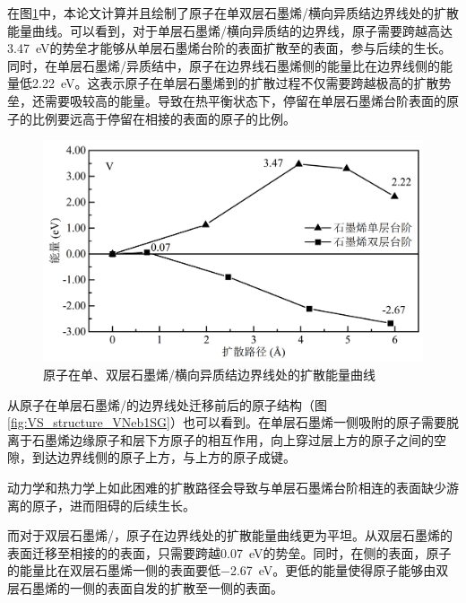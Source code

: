     在图\ref{fig:VS_DFT_NEB_V_GtVSe}中，本论文计算并且绘制了原子在单双层石墨烯/横向异质结边界线处的扩散能量曲线。可以看到，对于单层石墨烯/横向异质结的边界线，原子需要跨越高达\SI{3.47}{\electronvolt}的势垒才能够从单层石墨烯台阶的表面扩散至的表面，参与后续的生长。同时，在单层石墨烯/异质结中，原子在边界线石墨烯侧的能量比在边界线侧的能量低\SI{2.22}{\electronvolt}。这表示原子在单层石墨烯到的扩散过程不仅需要跨越极高的扩散势垒，还需要吸较高的能量。导致在热平衡状态下，停留在单层石墨烯台阶表面的原子的比例要远高于停留在相接的表面的原子的比例。

    \begin{figure}[htb]
        \includegraphics{pic/VS_DFT_NEB_V_GtVSe.png}
        \captionsetup{width=\textwidth}
        \caption{原子在单、双层石墨烯/横向异质结边界线处的扩散能量曲线}
        \label{fig:VS_DFT_NEB_V_GtVSe}
    \end{figure}
    

    从原子在单层石墨烯/的边界线处迁移前后的原子结构（图\ref{fig:VS_structure_VNeb1SG}）也可以看到。在单层石墨烯一侧吸附的原子需要脱离于石墨烯边缘原子和层下方原子的相互作用，向上穿过层上方的原子之间的空隙，到达边界线侧的原子上方，与上方的原子成键。

    动力学和热力学上如此困难的扩散路径会导致与单层石墨烯台阶相连的表面缺少游离的原子，进而阻碍的后续生长。

    而对于双层石墨烯/，原子在边界线处的扩散能量曲线更为平坦。从双层石墨烯的表面迁移至相接的的表面，只需要跨越\SI{0.07}{\electronvolt}的势垒。同时，在侧的表面，原子的能量比在双层石墨烯一侧的表面要低\SI{-2.67}{\electronvolt}。更低的能量使得原子能够由双层石墨烯的一侧的表面自发的扩散至一侧的表面。


